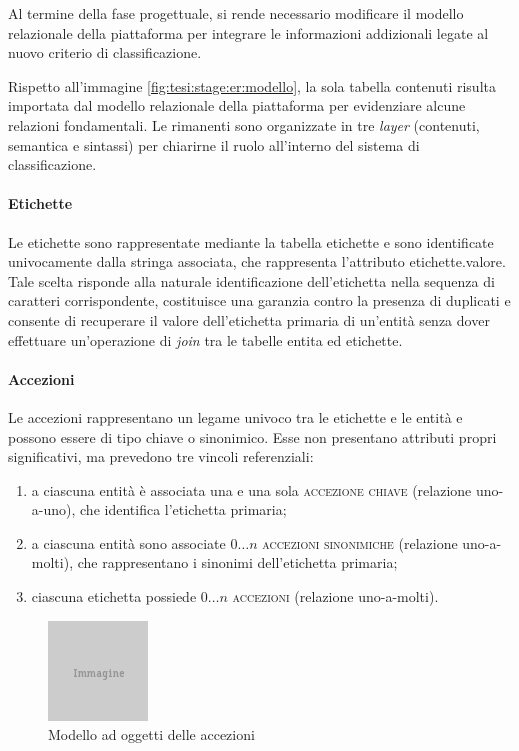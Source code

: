 Al termine della fase progettuale, si rende necessario modificare il modello relazionale della piattaforma per integrare le informazioni addizionali legate al nuovo criterio di classificazione.

Rispetto all'immagine \ref{fig:tesi:stage:er:modello}, la sola tabella \textsf{contenuti} risulta importata dal modello relazionale della piattaforma per evidenziare alcune relazioni fondamentali. Le rimanenti sono organizzate in tre \textit{layer} (\textsf{contenuti}, \textsf{semantica} e \textsf{sintassi}) per chiarirne il ruolo all'interno del sistema di classificazione.

\paragraph{Etichette}
Le etichette sono rappresentate mediante la tabella \textsf{etichette} e sono identificate univocamente dalla stringa associata, che rappresenta l'attributo \textsf{etichette.valore}. Tale scelta risponde alla naturale identificazione dell'etichetta nella sequenza di caratteri corrispondente, costituisce una garanzia contro la presenza di duplicati e consente di recuperare il valore dell'etichetta primaria di un'entità senza dover effettuare un'operazione di \textit{join} tra le tabelle \textsf{entita} ed \textsf{etichette}.

\paragraph{Accezioni}
Le accezioni rappresentano un legame univoco tra le etichette e le entità e possono essere di tipo chiave o sinonimico. Esse non presentano attributi propri significativi, ma prevedono tre vincoli referenziali:
\begin{enumerate}
\item a ciascuna entità è associata una e una sola \textsc{accezione chiave} (relazione uno-a-uno), che identifica l'etichetta primaria;
\item a ciascuna entità sono associate $0\ldots n$ \textsc{accezioni sinonimiche} (relazione uno-a-molti), che rappresentano i sinonimi dell'etichetta primaria;
\item ciascuna etichetta possiede $0\ldots n$ \textsc{accezioni} (relazione uno-a-molti).
\end{enumerate}

\begin{figure}[ht]
	\begin{center}
		\includegraphics{placeholder.png}
		\caption{Modello ad oggetti delle accezioni}
		\label{fig:tesi:stage:er:accezioni}
	\end{center}
\end{figure}

